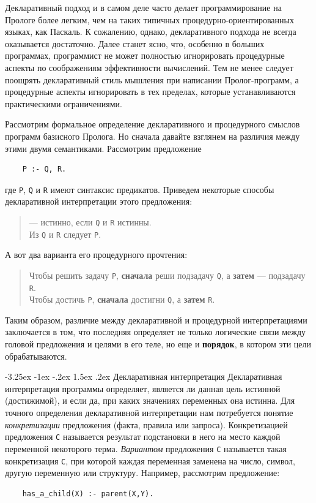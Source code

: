 \documentclass[12pt, openany, twoside]{book} %
\makeatletter
\renewcommand\section{\@startsection {section}{1}{\z@}%
                                   {-3.25ex \@plus -1ex \@minus -.2ex}%
                                   {1.5ex \@plus.2ex}%
                                   {\normalfont\large\bfseries}}
\makeatother
\begin{document}
Декларативный подход и в самом деле часто делает программирование на Прологе более легким, чем на таких типичных процедур\-но-ориентированных языках, как Паскаль. К сожалению, однако, декларативного подхода не всегда оказывается достаточно. Далее станет ясно, что, особенно в больших программах, программист не может полностью игнорировать процедурные аспекты по соображениям эффективности вычислений. Тем не менее следует поощрять декларативный стиль мышления при написании Пролог-программ, а процедурные аспекты игнорировать в тех пределах, которые устанавливаются практическими ограничениями.

Рассмотрим формальное определение декларативного и процедурного смыслов программ базисного Пролога. Но сначала давайте взглянем на различия между этими двумя семантиками. Рассмотрим предложение
{\tt\begin{verbatim}
    Р :- Q, R.
\end{verbatim}}
\noindent где {\tt Р}, {\tt Q} и {\tt R} имеют синтаксис предикатов. Приведем некоторые способы декларативной интерпретации этого предложения:
\begin{quote}
 --- истинно, если {\tt Q} и {\tt R} истинны. \\
Из {\tt Q} и {\tt R} следует {\tt Р}.
\end{quote}

\noindent А вот два варианта его процедурного прочтения:

\begin{quote}
\noindent Чтобы решить задачу {\tt Р}, \textbf{сначала} реши подзадачу {\tt Q}, а {\bf затем} --- подзадачу {\tt R}. \\
Чтобы достичь {\tt Р}, \textbf{сначала} достигни {\tt Q},
а \textbf{затем} {\tt R}.
\end{quote}

Таким образом, различие между декларативной и процедурной интерпретациями заключается в том, что последняя определяет не только логические связи между головой предложения и целями в его теле, но еще и {\bf порядок}, в котором эти цели обрабатываются.

\section{Декларативная интерпретация}
Декларативная интерпретация программы определяет, является ли данная цель истинной (достижимой), и если да, при каких значениях переменных она истинна. Для точного определения декларативной интерпретации нам потребуется понятие \emph{конкретизации} предложения (факта, правила или запроса). Конкретизацией предложения {\tt С} называется результат подстановки в него на место каждой переменной некоторого терма. \emph{Вариантом} предложения {\tt С} называется такая конкретизация {\tt С}, при которой каждая переменная заменена на число, символ, другую переменную или структуру. Например, рассмотрим предложение:
{\tt\begin{verbatim}
    has_a_child(X) :- parent(X,Y).
\end{verbatim}}
\end{document}
